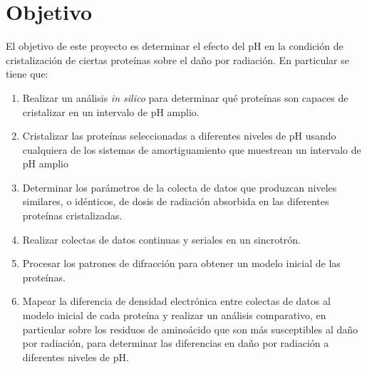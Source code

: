\documentclass[11pt,letterpaper]{article}
\begin{document}
	\section{Objetivo}
	El objetivo de este proyecto es determinar el efecto del pH en la condición de cristalización de ciertas proteínas sobre el daño por radiación. En particular se tiene que:
	\begin{enumerate}
		\item Realizar un análisis \emph{in silico} para determinar qué proteínas son capaces de cristalizar en un intervalo de pH amplio.
		\item Cristalizar las proteínas seleccionadas a diferentes niveles de pH usando cualquiera de los sistemas de amortiguamiento que muestrean un intervalo de pH amplio
		\item Determinar los parámetros de la colecta de datos que produzcan niveles similares, o idénticos, de dosis de radiación absorbida en las diferentes proteínas cristalizadas.
		\item Realizar colectas de datos continuas y seriales en un sincrotrón.
		\item Procesar los patrones de difracción para obtener un modelo inicial de las proteínas.
		\item Mapear la diferencia de densidad electrónica entre colectas de datos al modelo inicial de cada proteína y realizar un análisis comparativo, en particular sobre los residuos de aminoácido que son más susceptibles al daño por radiación, para determinar las diferencias en daño por radiación a diferentes niveles de pH.
	\end{enumerate}	
	
\end{document}
